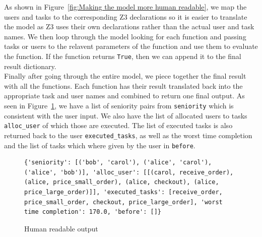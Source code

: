 \documentclass[a4paper]{report}
\begin{document}
As shown in Figure~\ref{fig:Making the model more human readable}, we map the users and tasks to the corresponding Z3 declarations so it is easier to translate the model as Z3 uses their own declarations rather than the actual user and task names. We then loop through the model looking for each function and passing tasks or users to the relavent parameters of the function and use them to evaluate the function. If the function returns \texttt{True}, then we can append it to the final result dictionary. \\

Finally after going through the entire model, we piece together the final result with all the functions. Each function has their result translated back into the appropriate task and user names and combined to return one final output. As seen in Figure~\ref{fig:Human readable output}, we have a list of seniority pairs from \texttt{seniority} which is consistent with the user input. We also have the list of allocated users to tasks \texttt{alloc\_user} of which those are executed. The list of executed tasks is also returned back to the user \texttt{executed\_tasks}, as well as the worst time completion and the list of tasks which where given by the user in \texttt{before}.

\begin{figure}[!h]
\begin{lstlisting}[frame=single]
{'seniority': [('bob', 'carol'), ('alice', 'carol'), ('alice', 'bob')], 'alloc_user': [[(carol, receive_order), (alice, price_small_order), (alice, checkout), (alice, price_large_order)]], 'executed_tasks': [receive_order, price_small_order, checkout, price_large_order], 'worst time completion': 170.0, 'before': []}
\end{lstlisting}
\caption{Human readable output}
\label{fig:Human readable output}
\end{figure}
\end{document}
